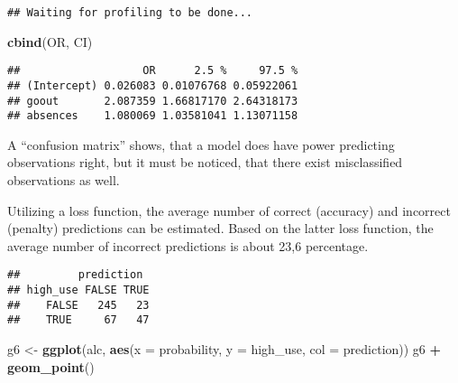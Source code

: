\documentclass[]{article}
\newenvironment{Shaded}{\begin{snugshade}}{\end{snugshade}}
\newcommand{\DataTypeTok}[1]{\textcolor[rgb]{0.13,0.29,0.53}{#1}}
\newcommand{\FloatTok}[1]{\textcolor[rgb]{0.00,0.00,0.81}{#1}}
\newcommand{\KeywordTok}[1]{\textcolor[rgb]{0.13,0.29,0.53}{\textbf{#1}}}
\newcommand{\NormalTok}[1]{#1}
\newcommand{\OperatorTok}[1]{\textcolor[rgb]{0.81,0.36,0.00}{\textbf{#1}}}
\newcommand{\StringTok}[1]{\textcolor[rgb]{0.31,0.60,0.02}{#1}}
\begin{document}
\begin{verbatim}
## Waiting for profiling to be done...
\end{verbatim}

\begin{Shaded}
\begin{Highlighting}[]
\KeywordTok{cbind}\NormalTok{(OR, CI)}
\end{Highlighting}
\end{Shaded}

\begin{verbatim}
##                   OR      2.5 %     97.5 %
## (Intercept) 0.026083 0.01076768 0.05922061
## goout       2.087359 1.66817170 2.64318173
## absences    1.080069 1.03581041 1.13071158
\end{verbatim}

A ``confusion matrix'' shows, that a model does have power predicting
observations right, but it must be noticed, that there exist
misclassified observations as well.

Utilizing a loss function, the average number of correct (accuracy) and
incorrect (penalty) predictions can be estimated. Based on the latter
loss function, the average number of incorrect predictions is about 23,6
percentage.

\begin{Shaded}
\end{Shaded}

\begin{verbatim}
##         prediction
## high_use FALSE TRUE
##    FALSE   245   23
##    TRUE     67   47
\end{verbatim}

\begin{Shaded}
\begin{Highlighting}[]
\NormalTok{g6 <-}\StringTok{ }\KeywordTok{ggplot}\NormalTok{(alc, }\KeywordTok{aes}\NormalTok{(}\DataTypeTok{x =}\NormalTok{ probability, }\DataTypeTok{y =}\NormalTok{ high_use, }\DataTypeTok{col =}\NormalTok{ prediction))}
\NormalTok{g6 }\OperatorTok{+}\StringTok{ }\KeywordTok{geom_point}\NormalTok{()}
\end{Highlighting}
\end{Shaded}
\end{document}
